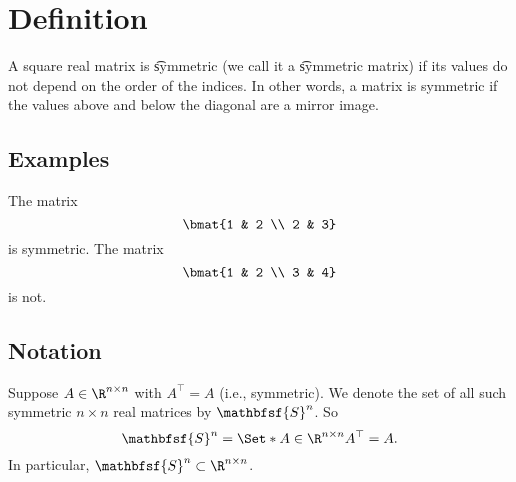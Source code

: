 
\section*{Definition}

A square real matrix is \t{symmetric} (we call it a \t{symmetric matrix}) if its values do not depend on the order of the indices.
In other words, a matrix is symmetric if the values above and below the diagonal are a mirror image.

\subsection*{Examples}

The matrix
\[
\bmat{1 & 2 \\ 2 & 3}
\]
is symmetric.
The matrix
\[
\bmat{1 & 2 \\ 3 & 4}
\]
is not.

\subsection*{Notation}

Suppose $A \in \R ^{n \times  n}$ with $A^\top  = A$ (i.e., symmetric).
We denote the set of all such symmetric $n \times  n$ real matrices by $\mathbfsf{S} ^n$.
So
\[
\mathbfsf{S} ^n = \Set*{A \in \R ^{n \times  n}}{A^\top  = A}.
\]
In particular, $\mathbfsf{S} ^n \subset \R ^{n \times  n}$.

\blankpage